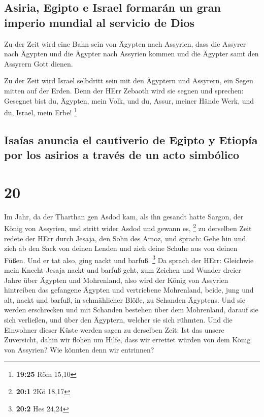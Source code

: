 \hypertarget{asiria-egipto-e-israel-formaruxe1n-un-gran-imperio-mundial-al-servicio-de-dios}{%
\subsection{Asiria, Egipto e Israel formarán un gran imperio mundial al
servicio de
Dios}\label{asiria-egipto-e-israel-formaruxe1n-un-gran-imperio-mundial-al-servicio-de-dios}}

 Zu der Zeit wird eine Bahn sein von Ägypten nach
Assyrien, dass die Assyrer nach Ägypten und die Ägypter nach Assyrien
kommen und die Ägypter samt den Assyrern Gott dienen.

 Zu der Zeit wird Israel selbdritt sein mit den Ägyptern
und Assyrern, ein Segen mitten auf der Erden.  Denn der
HErr Zebaoth wird sie segnen und sprechen: Gesegnet bist du, Ägypten,
mein Volk, und du, Assur, meiner Hände Werk, und du, Israel, mein Erbe!
\footnote{\textbf{19:25} Röm 15,10}

\hypertarget{isauxedas-anuncia-el-cautiverio-de-egipto-y-etiopuxeda-por-los-asirios-a-travuxe9s-de-un-acto-simbuxf3lico}{%
\subsection{Isaías anuncia el cautiverio de Egipto y Etiopía por los
asirios a través de un acto
simbólico}\label{isauxedas-anuncia-el-cautiverio-de-egipto-y-etiopuxeda-por-los-asirios-a-travuxe9s-de-un-acto-simbuxf3lico}}

\hypertarget{section-19}{%
\section{20}\label{section-19}}

 Im Jahr, da der Tharthan gen Asdod kam, als ihn gesandt
hatte Sargon, der König von Assyrien, und stritt wider Asdod und gewann
es, \footnote{\textbf{20:1} 2Kö 18,17}  zu derselben Zeit
redete der HErr durch Jesaja, den Sohn des Amoz, und sprach: Gehe hin
und zieh ab den Sack von deinen Lenden und zieh deine Schuhe aus von
deinen Füßen. Und er tat also, ging nackt und barfuß. \footnote{\textbf{20:2}
  Hes 24,24}  Da sprach der HErr: Gleichwie mein Knecht
Jesaja nackt und barfuß geht, zum Zeichen und Wunder dreier Jahre über
Ägypten und Mohrenland,  also wird der König von Assyrien
hintreiben das gefangene Ägypten und vertriebene Mohrenland, beide, jung
und alt, nackt und barfuß, in schmählicher Blöße, zu Schanden Ägyptens.
 Und sie werden erschrecken und mit Schanden bestehen über
dem Mohrenland, darauf sie sich verließen, und über den Ägyptern,
welcher sie sich rühmten.  Und die Einwohner dieser Küste
werden sagen zu derselben Zeit: Ist das unsere Zuversicht, dahin wir
flohen um Hilfe, dass wir errettet würden von dem König von Assyrien?
Wie könnten denn wir entrinnen?

